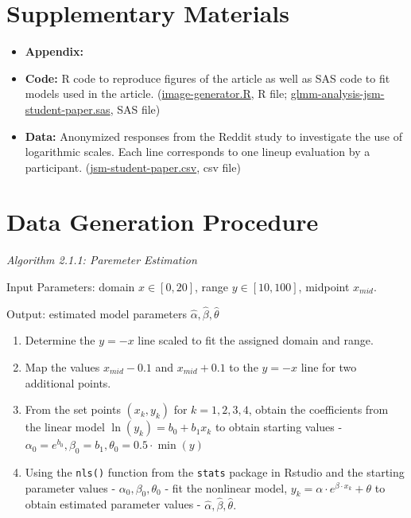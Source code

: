 \documentclass[]{interact}
\theoremstyle{plain}%
\theoremstyle{definition}
\theoremstyle{remark}
\begin{document}
\hypertarget{supplementary-materials}{%
\section*{Supplementary Materials}\label{supplementary-materials}}

\begin{itemize}
\item
  \textbf{Appendix:}
\item
  \textbf{Code:} R code to reproduce figures of the article as well as
  SAS code to fit models used in the article.
  (\href{https://github.com/srvanderplas/Perception-of-Log-Scales/blob/master/manuscripts/jsm-2021-student-paper-submission/code/image-generator.R}{image-generator.R},
  R file;
  \href{https://github.com/srvanderplas/Perception-of-Log-Scales/blob/master/lineups-pilot-analysis/sasCode/glmm-analysis-jsm-student-paper.sas}{glmm-analysis-jsm-student-paper.sas},
  SAS file)
\item
  \textbf{Data:} Anonymized responses from the Reddit study to
  investigate the use of logarithmic scales. Each line corresponds to
  one lineup evaluation by a participant.
  (\href{https://github.com/srvanderplas/Perception-of-Log-Scales/blob/master/lineups-pilot-analysis/data/jsm-student-paper-11302020.csv}{jsm-student-paper.csv},
  csv file)
\end{itemize}

\clearpage
\appendix

\hypertarget{data-generation-procedure}{%
\section{\texorpdfstring{Data Generation
Procedure\label{app:generation}}{Data Generation Procedure}}\label{data-generation-procedure}}

\textit{Algorithm 2.1.1: Paremeter Estimation}

Input Parameters: domain \(x\in[0,20]\), range \(y\in[10,100]\),
midpoint \(x_{mid}\).

Output: estimated model parameters \(\hat\alpha, \hat\beta, \hat\theta\)

\begin{enumerate}
\def\labelenumi{\arabic{enumi}.}
\item
  Determine the \(y=-x\) line scaled to fit the assigned domain and
  range.
\item
  Map the values \(x_{mid} - 0.1\) and \(x_{mid} + 0.1\) to the \(y=-x\)
  line for two additional points.
\item
  From the set points \((x_k, y_k)\) for \(k = 1,2,3,4\), obtain the
  coefficients from the linear model \(\ln(y_k) = b_0 +b_1x_k\) to
  obtain starting values -
  \(\alpha_0 = e^{b_0}, \beta_0 = b_1, \theta_0 = 0.5\cdot \min(y)\)
\item
  Using the \texttt{nls()} function from the \texttt{stats} package in
  Rstudio and the starting parameter values -
  \(\alpha_0, \beta_0, \theta_0\) - fit the nonlinear model,
  \(y_k = \alpha\cdot e^{\beta\cdot x_k}+\theta\) to obtain estimated
  parameter values - \(\hat\alpha, \hat\beta, \hat\theta.\)
\end{enumerate}
\end{document}
